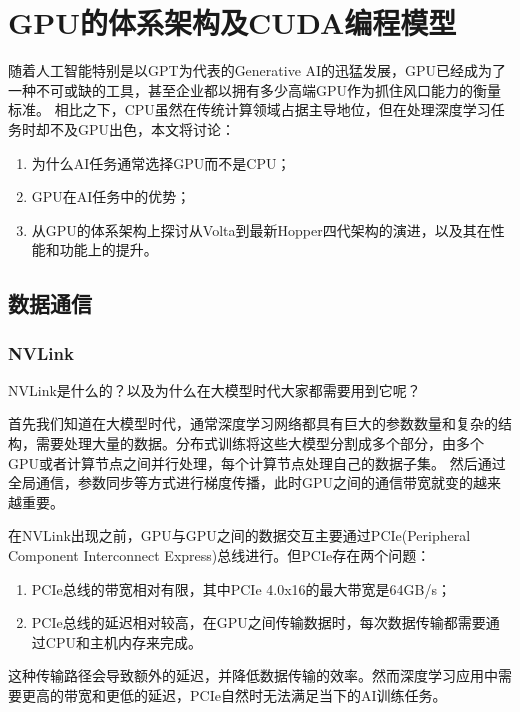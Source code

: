 \chapter{GPU的体系架构及CUDA编程模型}

随着人工智能特别是以GPT为代表的Generative AI的迅猛发展，GPU已经成为了一种不可或缺的工具，甚至企业都以拥有多少高端GPU作为抓住风口能力的衡量标准。
相比之下，CPU虽然在传统计算领域占据主导地位，但在处理深度学习任务时却不及GPU出色，本文将讨论：

\begin{enumerate}
	\item 为什么AI任务通常选择GPU而不是CPU；
    \item GPU在AI任务中的优势；
    \item 从GPU的体系架构上探讨从Volta到最新Hopper四代架构的演进，以及其在性能和功能上的提升。
\end{enumerate}

\section{数据通信}

\subsection{NVLink}

NVLink是什么的？以及为什么在大模型时代大家都需要用到它呢？

首先我们知道在大模型时代，通常深度学习网络都具有巨大的参数数量和复杂的结构，需要处理大量的数据。分布式训练将这些大模型分割成多个部分，由多个GPU或者计算节点之间并行处理，每个计算节点处理自己的数据子集。
然后通过全局通信，参数同步等方式进行梯度传播，此时GPU之间的通信带宽就变的越来越重要。

在NVLink出现之前，GPU与GPU之间的数据交互主要通过PCIe(Peripheral Component Interconnect Express)总线进行。但PCIe存在两个问题：

\begin{enumerate}
	\item PCIe总线的带宽相对有限，其中PCIe 4.0x16的最大带宽是64GB/s；
    \item PCIe总线的延迟相对较高，在GPU之间传输数据时，每次数据传输都需要通过CPU和主机内存来完成。
\end{enumerate}

这种传输路径会导致额外的延迟，并降低数据传输的效率。然而深度学习应用中需要更高的带宽和更低的延迟，PCIe自然时无法满足当下的AI训练任务。

